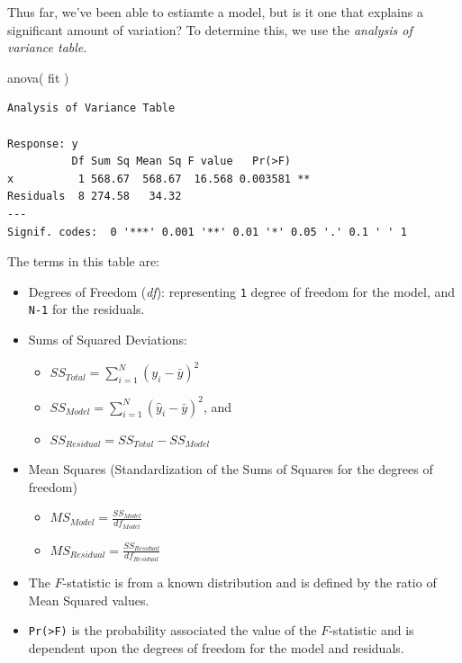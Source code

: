 \documentclass[
  letterpaper,
]{book}
\newenvironment{Shaded}{\begin{snugshade}}{\end{snugshade}}
\newcommand{\FunctionTok}[1]{\textcolor[rgb]{0.28,0.35,0.67}{#1}}
\newcommand{\NormalTok}[1]{\textcolor[rgb]{0.00,0.23,0.31}{#1}}
\providecommand{\tightlist}{%
  \setlength{\itemsep}{0pt}\setlength{\parskip}{0pt}}
\begin{document}
Thus far, we've been able to estiamte a model, but is it one that
explains a significant amount of variation? To determine this, we use
the \emph{analysis of variance table}.

\begin{Shaded}
\begin{Highlighting}[]
\FunctionTok{anova}\NormalTok{( fit )}
\end{Highlighting}
\end{Shaded}

\begin{verbatim}
Analysis of Variance Table

Response: y
          Df Sum Sq Mean Sq F value   Pr(>F)   
x          1 568.67  568.67  16.568 0.003581 **
Residuals  8 274.58   34.32                    
---
Signif. codes:  0 '***' 0.001 '**' 0.01 '*' 0.05 '.' 0.1 ' ' 1
\end{verbatim}

The terms in this table are:

\begin{itemize}
\item
  Degrees of Freedom (\emph{df}): representing \texttt{1} degree of
  freedom for the model, and \texttt{N-1} for the residuals.
\item
  Sums of Squared Deviations:

  \begin{itemize}
  \tightlist
  \item
    \(SS_{Total} = \sum_{i=1}^N (y_i - \bar{y})^2\)
  \item
    \(SS_{Model} = \sum_{i=1}^N (\hat{y}_i - \bar{y})^2\), and
  \item
    \(SS_{Residual} = SS_{Total} - SS_{Model}\)
  \end{itemize}
\item
  Mean Squares (Standardization of the Sums of Squares for the degrees
  of freedom)

  \begin{itemize}
  \tightlist
  \item
    \(MS_{Model} = \frac{SS_{Model}}{df_{Model}}\)
  \item
    \(MS_{Residual} = \frac{SS_{Residual}}{df_{Residual}}\)
  \end{itemize}
\item
  The \(F\)-statistic is from a known distribution and is defined by the
  ratio of Mean Squared values.
\item
  \texttt{Pr(\textgreater{}F)} is the probability associated the value
  of the \(F\)-statistic and is dependent upon the degrees of freedom
  for the model and residuals.
\end{itemize}
\end{document}
